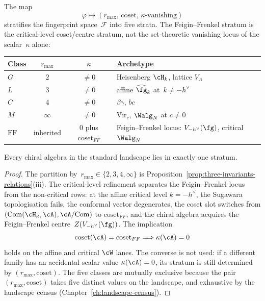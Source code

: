 \begin{theorem}
\label{thm:five-class-stratum}
\ClaimStatusProvedHere
The map
\[
 \varphi \longmapsto
 (r_{\max},\,\mathrm{coset},\,\kappa\text{-vanishing})
\]
stratifies the fingerprint space~$\mathcal{F}$ into five strata. The
Feigin--Frenkel stratum is the critical-level coset/centre stratum,
not the set-theoretic vanishing locus of the scalar~$\kappa$ alone:
\begin{center}
\renewcommand{\arraystretch}{1.25}
\begin{tabular}{lccl}
\textbf{Class} & $r_{\max}$ & $\kappa$ & \textbf{Archetype} \\
\hline
$G$ & $2$ & $\neq 0$ & Heisenberg $\cH_k$, lattice $V_\Lambda$ \\
$L$ & $3$ & $\neq 0$ & affine $\widehat{\fg}_k$ at~$k \neq -h^\vee$ \\
$C$ & $4$ & $\neq 0$ & $\beta\gamma$, $bc$ \\
$M$ & $\infty$ & $\neq 0$ & $\mathrm{Vir}_c$, $\Walg_N$ at $c \neq 0$ \\
$\mathrm{FF}$ & inherited & $0$ plus $\mathrm{coset}_{FF}$ & Feigin--Frenkel locus: $V_{-h^\vee}(\fg)$, critical $\Walg_N$
\end{tabular}
\end{center}
Every chiral algebra in the standard landscape lies in exactly one stratum.
\end{theorem}

\begin{proof}
The partition by~$r_{\max}\in\{2,3,4,\infty\}$ is
Proposition~\ref{prop:three-invariants-relations}(iii). The
critical-level refinement separates the Feigin--Frenkel locus from
the non-critical rows: at the affine critical level
$k=-h^\vee$, the Sugawara topologisation fails, the conformal vector
degenerates, the coset slot switches from
$(\mathrm{Com}(\cH_\kappa,\cA),\cA/\mathrm{Com})$ to
$\mathrm{coset}_{FF}$, and the chiral algebra acquires the
Feigin--Frenkel centre~$Z(V_{-h^\vee}(\fg))$. The implication
\[
 \mathrm{coset}(\cA)=\mathrm{coset}_{FF}
 \Longrightarrow \kappa(\cA)=0
\]
holds on the affine and critical $\cW$ lanes. The converse is not
used: if a different family has an accidental scalar value
$\kappa(\cA)=0$, its stratum is still determined by
$(r_{\max},\mathrm{coset})$. The five classes are mutually exclusive
because the pair~$(r_{\max},\mathrm{coset})$ takes five distinct
values on the landscape, and exhaustive by the landscape census
(Chapter~\ref{ch:landscape-census}).
\end{proof}

